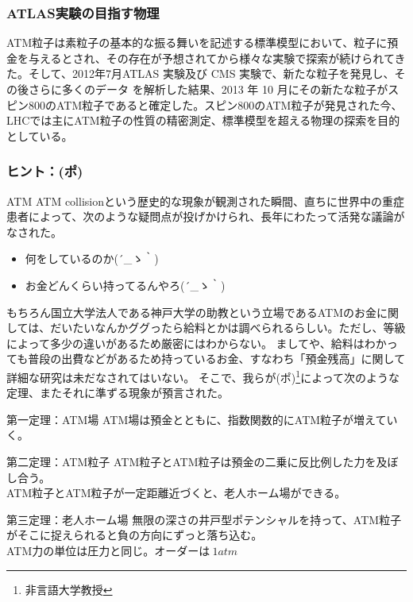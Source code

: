 \documentclass[12pt]{jsarticle}
\begin{document}
\subsubsection*{ATLAS実験の目指す物理}
ATM粒子は素粒子の基本的な振る舞いを記述する標準模型において、粒子に預金を与えるとされ、その存在が予想されてから様々な実験で探索が続けられてきた。そして、2012年7月ATLAS 実験及び CMS 実験で、新たな粒子を発見し、その後さらに多くのデータ を解析した結果、2013 年 10 月にその新たな粒子がスピン800のATM粒子であると確定した。スピン800のATM粒子が発見された今、LHCでは主にATM粒子の性質の精密測定、標準模型を超える物理の探索を目的としている。


\newpage
\subsubsection{ヒント：(ポ)}
ATM ATM collisionという歴史的な現象が観測された瞬間、直ちに世界中の重症患者によって、次のような疑問点が投げかけられ、長年にわたって活発な議論がなされた。

\begin{itemize}
\item 何をしているのか{\sf (´\_ゝ｀)}
\item お金どんくらい持ってるんやろ{\sf(´\_ゝ｀)}
\end{itemize}

もちろん国立大学法人である神戸大学の助教という立場であるATMのお金に関しては、だいたいなんかググったら給料とかは調べられるらしい。ただし、等級によって多少の違いがあるため厳密にはわからない。%
ましてや、給料はわかっても普段の出費などがあるため持っているお金、すなわち「預金残高」に関して詳細な研究は未だなされてはいない。
そこで、我らが(ポ)\footnote{非言語大学教授}によって次のような定理、またそれに準ずる現象が預言された。




\begin{itembox}[c]{第一定理：ATM場}
ATM場は預金とともに、指数関数的にATM粒子が増えていく。
\end{itembox}

\begin{itembox}[c]{第二定理：ATM粒子}
ATM粒子とATM粒子は預金の二乗に反比例した力を及ぼし合う。\\
ATM粒子とATM粒子が一定距離近づくと、老人ホーム場ができる。
\end{itembox}

\begin{itembox}[c]{第三定理：老人ホーム場}
無限の深さの井戸型ポテンシャルを持って、ATM粒子がそこに捉えられると負の方向にずっと落ち込む。\\
ATM力の単位は圧力と同じ。オーダーは$~1 atm$
\end{itembox}
\end{document}
